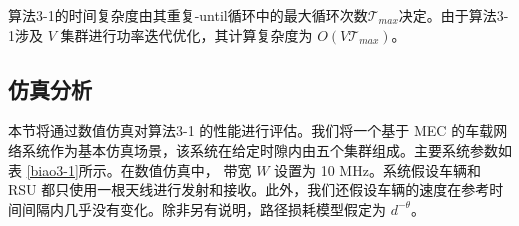 算法3-1的时间复杂度由其重复-until循环中的最大循环次数$\mathcal{T}_{max}$决定。由于算法3-1涉及 $V$ 集群进行功率迭代优化，其计算复杂度为 $O(V\mathcal{T}_{max})$。

\subsection{仿真分析}\label{section3-4-2}
本节将通过数值仿真对算法3-1 的性能进行评估。我们将一个基于 MEC 的车载网络系统作为基本仿真场景，该系统在给定时隙内由五个集群组成。主要系统参数如表 \ref{biao3-1}所示。在数值仿真中，
带宽 $W$ 设置为 10 MHz。系统假设车辆和 RSU 都只使用一根天线进行发射和接收。此外，我们还假设车辆的速度在参考时间间隔内几乎没有变化。除非另有说明，路径损耗模型假定为 $d^{-\theta}$。

